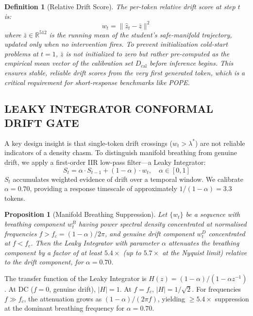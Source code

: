 \documentclass{ieeetmlcn}
\newtheorem{proposition}{Proposition}
\newtheorem{definition}{Definition}
\begin{document}
\begin{definition}[Relative Drift Score]
The per-token relative drift score at step $t$ is:
\begin{equation}
  w_t = \|\hat{z}_t - \bar{z}\|^2
  \label{eq:drift}
\end{equation}
where $\bar{z} \in \mathbb{R}^{512}$ is the running mean of the student's safe-manifold trajectory, updated only when no intervention fires. To prevent initialization cold-start problems at $t=1$, $\bar{z}$ is not initialized to zero but rather pre-computed as the empirical mean vector of the calibration set $D_{\text{cal}}$ before inference begins. This ensures stable, reliable drift scores from the very first generated token, which is a critical requirement for short-response benchmarks like POPE.
\end{definition}


\subsection{LEAKY INTEGRATOR CONFORMAL DRIFT GATE}
A key design insight is that single-token drift crossings ($w_t > \lambda^*$)
are not reliable indicators of a density chasm. To distinguish manifold
breathing from genuine drift, we apply a first-order IIR low-pass
filter---a Leaky Integrator:
\begin{equation}
  S_t = \alpha \cdot S_{t-1} + (1-\alpha) \cdot w_t, \quad \alpha \in [0,1]
  \label{eq:leaky}
\end{equation}
$S_t$ accumulates weighted evidence of drift over a temporal window. We
calibrate $\alpha = 0.70$, providing a response timescale of
approximately $1/(1-\alpha) = 3.3$ tokens.

\begin{proposition}[Manifold Breathing Suppression]
\label{prop:suppression}
Let $\{w_t\}$ be a sequence with breathing component $w_t^B$ having
power spectral density concentrated at normalised frequencies
$f > f_c = (1-\alpha)/2\pi$, and genuine drift component $w_t^D$
concentrated at $f < f_c$. Then the Leaky Integrator with parameter
$\alpha$ attenuates the breathing component by a factor of at least
$5.4\times$ (up to $5.7\times$ at the Nyquist limit) relative to the
drift component, for $\alpha = 0.70$.
\end{proposition}

\begin{IEEEproof}
The transfer function of the Leaky Integrator is
$H(z) = (1-\alpha)/(1-\alpha z^{-1})$. At DC ($f=0$, genuine drift),
$|H|=1$. At $f = f_c$, $|H| = 1/\sqrt{2}$. For frequencies
$f \gg f_c$, the attenuation grows as $(1-\alpha)/(2\pi f)$, yielding
$\geq 5.4\times$ suppression at the dominant breathing frequency for
$\alpha = 0.70$.
\end{IEEEproof}
\end{document}

